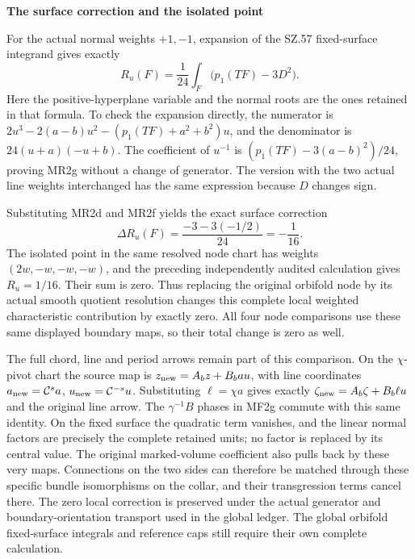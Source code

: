 \par

\medskip\noindent\textbf{The surface correction and the isolated point}

\par\nobreak

For the actual normal weights \(+1,-1\), expansion of the SZ.57
fixed-surface integrand gives exactly
\[
 R_u(F)=\frac1{24}\int_F\bigl(p_1(TF)-3D^2\bigr).
\tag{MR2g}
\]
Here the positive-hyperplane variable and the normal roots are the
ones retained in that formula. To check the expansion directly, the
numerator is
\(2u^3-2(a-b)u^2-(p_1(TF)+a^2+b^2)u\), and the denominator is
\(24(u+a)(-u+b)\). The coefficient of \(u^{-1}\) is
\((p_1(TF)-3(a-b)^2)/24\), proving MR2g without a change of
generator. The version with the two actual line weights interchanged
has the same expression because \(D\) changes sign.

Substituting MR2d and MR2f yields the exact surface correction
\[
 \Delta R_u(F)=\frac{-3-3(-1/2)}{24}=-\frac1{16}.
\]
The isolated point in the same resolved node chart has weights
\((2w,-w,-w,-w)\), and the preceding independently audited
calculation gives \(R_u=1/16\). Their sum is zero. Thus replacing
the original orbifold node by its actual smooth quotient resolution
changes this complete local weighted characteristic contribution by
exactly zero. All four node comparisons use these same displayed
boundary maps, so their total change is zero as well.

The full chord, line and period arrows remain part of this comparison.
On the \(\chi\)-pivot chart the source map is
\(z_{\rm new}=A_bz+B_bau\), with line coordinates
\(a_{\rm new}=\mathcal C^s a\),
\(u_{\rm new}=\mathcal C^{-s}u\). Substituting
\(\ell=\chi a\) gives exactly
\(\zeta_{\rm new}=A_b\zeta+B_b\ell u\) and the original
line arrow. The \(\gamma^{-1}B\) phases in MF2g commute with
this same identity. On the fixed surface the quadratic term vanishes,
and the linear normal factors are precisely the complete retained
units; no factor is replaced by its central value. The original
marked-volume coefficient also pulls back by these very maps.
Connections on the two sides can therefore be matched through these
specific bundle isomorphisms on the collar, and their transgression
terms cancel there. The zero local correction is preserved under the
actual generator and boundary-orientation transport used in the global
ledger. The global orbifold fixed-surface integrals and reference caps
still require their own complete calculation.

